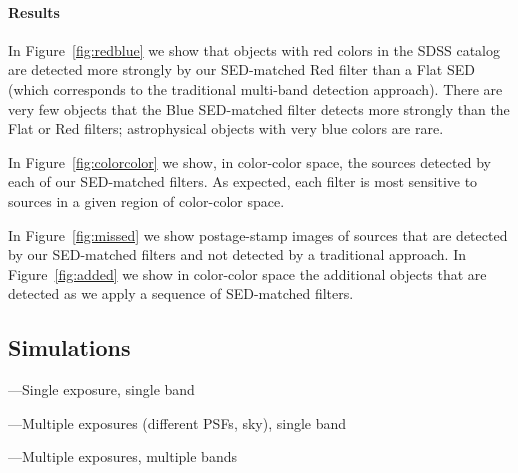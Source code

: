 \documentclass[letterpaper,preprint]{aastex}
\newcommand{\fig}{Figure}
\newcommand{\figref}[1]{\mbox{\fig~\ref{#1}}}
\begin{document}

\paragraph{Results}
In \figref{fig:redblue} we show that objects with red colors in the
SDSS catalog are detected more strongly by our SED-matched Red filter
than a Flat SED (which corresponds to the traditional multi-band
detection approach).  There are very few objects that the Blue
SED-matched filter detects more strongly than the Flat or Red filters;
astrophysical objects with very blue colors are rare.

In \figref{fig:colorcolor} we show, in color-color space, the sources
detected by each of our SED-matched filters.  As expected, each filter
is most sensitive to sources in a given region of color-color space.


In \figref{fig:missed} we show postage-stamp images of sources that
are detected by our SED-matched filters and not detected by a
traditional approach.  In \figref{fig:added} we show in color-color
space the additional objects that are detected as we apply a sequence
of SED-matched filters.



\subsection{Simulations}

---Single exposure, single band

---Multiple exposures (different PSFs, sky), single band

---Multiple exposures, multiple bands
\end{document}
